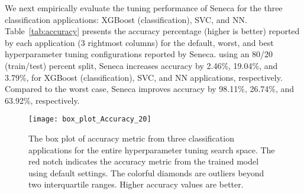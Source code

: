 We next empirically evaluate the tuning performance of Seneca for the three
classification applications: XGBoost (classification), SVC, and NN.
Table~\ref{tab:accuracy} presents the accuracy percentage (higher is
better) reported by each application (3 rightmost columns) for the default,
worst, and best hyperparameter tuning configurations reported by Seneca.
using an 80/20 (train/test) percent split,
Seneca increases accuracy by 2.46\%, 19.04\%, and 3.79\%, for XGBoost
(classification), SVC, and NN applications, respectively.  Compared to
the worst case, Seneca improves accuracy by 98.11\%, 26.74\%, and 63.92\%,
respectively.


\begin{table}
\centering

\caption{The Accuracy reported for the 
default, best (Seneca's recommendation), and worst hyperparameter configurations for 
the three classification applications using 80\% of the data to train and 20\%
of the data as a test set. 
For the accuracy values in the table, higher is better.
\label{tab:accuracy}}
\vspace{-0.2in}
\end{table}



\begin{figure}[t] \centering 
\texttt{[image: box\_plot\_Accuracy\_20]}
\vspace{-0.4in}
\caption{The box plot of accuracy metric from three classification applications for the entire hyperparameter tuning search space. The red notch indicates the accuracy metric from the trained model using default settings. The colorful diamonds are outliers beyond two interquartile ranges. Higher accuracy values are better.
\label{fig:box_plot_accuracy}}
\vspace{-0.1in}
\end{figure}

